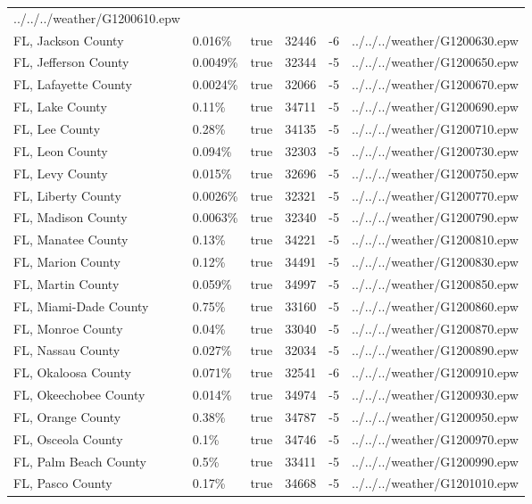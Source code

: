 \begin{longtable}[]{@{}llllll@{}}
../../../weather/G1200610.epw \\
FL, Jackson County & 0.016\% & true & 32446 & -6 &
../../../weather/G1200630.epw \\
FL, Jefferson County & 0.0049\% & true & 32344 & -5 &
../../../weather/G1200650.epw \\
FL, Lafayette County & 0.0024\% & true & 32066 & -5 &
../../../weather/G1200670.epw \\
FL, Lake County & 0.11\% & true & 34711 & -5 &
../../../weather/G1200690.epw \\
FL, Lee County & 0.28\% & true & 34135 & -5 &
../../../weather/G1200710.epw \\
FL, Leon County & 0.094\% & true & 32303 & -5 &
../../../weather/G1200730.epw \\
FL, Levy County & 0.015\% & true & 32696 & -5 &
../../../weather/G1200750.epw \\
FL, Liberty County & 0.0026\% & true & 32321 & -5 &
../../../weather/G1200770.epw \\
FL, Madison County & 0.0063\% & true & 32340 & -5 &
../../../weather/G1200790.epw \\
FL, Manatee County & 0.13\% & true & 34221 & -5 &
../../../weather/G1200810.epw \\
FL, Marion County & 0.12\% & true & 34491 & -5 &
../../../weather/G1200830.epw \\
FL, Martin County & 0.059\% & true & 34997 & -5 &
../../../weather/G1200850.epw \\
FL, Miami-Dade County & 0.75\% & true & 33160 & -5 &
../../../weather/G1200860.epw \\
FL, Monroe County & 0.04\% & true & 33040 & -5 &
../../../weather/G1200870.epw \\
FL, Nassau County & 0.027\% & true & 32034 & -5 &
../../../weather/G1200890.epw \\
FL, Okaloosa County & 0.071\% & true & 32541 & -6 &
../../../weather/G1200910.epw \\
FL, Okeechobee County & 0.014\% & true & 34974 & -5 &
../../../weather/G1200930.epw \\
FL, Orange County & 0.38\% & true & 34787 & -5 &
../../../weather/G1200950.epw \\
FL, Osceola County & 0.1\% & true & 34746 & -5 &
../../../weather/G1200970.epw \\
FL, Palm Beach County & 0.5\% & true & 33411 & -5 &
../../../weather/G1200990.epw \\
FL, Pasco County & 0.17\% & true & 34668 & -5 &
../../../weather/G1201010.epw \\

\end{longtable}
